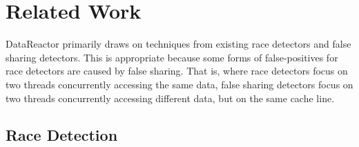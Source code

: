 \documentclass{sig-alternate}
\newcommand{\Toolname}{DataReactor}
\begin{document}


\section{Related Work}\label{sec:background}
\Toolname{} primarily draws on techniques from existing race detectors and false sharing detectors.
This is appropriate because some forms of false-positives for race detectors are caused by false
sharing. That is, where race detectors focus on two threads concurrently accessing the same
data, false sharing detectors focus on two threads concurrently accessing different data, but
on the same cache line.

\subsection{Race Detection}
\end{document}
